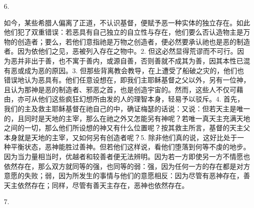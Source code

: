 6. \par

如今，某些希腊人偏离了正道，不认识基督，便赋予恶一种实体的独立存在。如此他们犯了双重错误：若恶具有自己独立的自立性与存在，他们要么否认造物主是万物的创造者；要么，若他们意指祂是万物之创造者，便必然要承认祂也是恶的制造者。因为依他们之见，恶被列入存在之物中。2. 但这必然显得荒谬而不可行。因为恶并非出于善，也不寓于善内，或源自善，否则善就不成其为善，因其本性已混有恶或成为恶的原因。3. 但那些背离教会教导，在上遭受了船破之灾的，他们也错误地认为恶具有。他们任意设想在，即我们主耶稣基督之父以外，另有一位神，且认为那神是恶的制造者、邪恶之首，也是创造宇宙的。然而，这些人不仅可藉由，亦可从他们这些疯狂幻想所由发的人的理智本身，轻易予以驳斥。4. 首先，我们的主及救主耶稣基督在祂自己的中，确证梅瑟的话说：又说：但若天主是唯一的，且同时是天地的主宰，那么在祂之外又怎能另有神呢？若唯一真天主充满天地之间的一切，那么他们所设想的神又有什么位置呢？按其救主所言，基督的天主父本身就是天地的主宰，又如何另有创造者呢？5. 除非他们真的说，这好比处于一种平衡状态，恶神能胜过善神。但若他们这样说，看他们堕落到何等不虔的地步。因为当力量相当时，优越者和较善者便无法辨明。因为若一方即使另一方不情愿也依然存在，那么双方就同等的强，也同等的弱：强，因为任何一方的存在都是对方意愿的失败；弱，因为所发生的事情与他们的意愿相反：因为尽管有恶神存在，善天主依然存在；同样，尽管有善天主存在，恶神也依然存在。\par

7. \par

